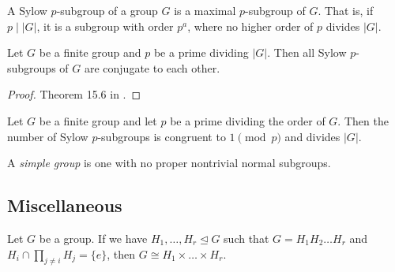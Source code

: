 \begin{df}
A Sylow $p$-subgroup of a group $G$ is a maximal $p$-subgroup of $G$.
That is, if $p \mid |G|$, it is a subgroup with order $p^a$, where no higher 
order of $p$ divides $|G|$.
\end{df}

\begin{theorem}[Sylow II]
    Let $G$ be a finite group and $p$ be a prime dividing $|G|$. 
    Then all Sylow $p$-subgroups of $G$ are conjugate to each other. 
\end{theorem}
\begin{proof}
    Theorem 15.6 in \cite{judson}.
\end{proof}

\begin{theorem}
    Let $G$ be a finite group and let $p$ be a prime dividing the order of $G$. 
    Then the number of Sylow $p$-subgroups is congruent to $1 \pmod{p}$ and 
    divides $|G|$.
\end{theorem}

\begin{df}
    A \emph{simple group} is one with no proper nontrivial normal subgroups.
\end{df}

\subsection{Miscellaneous}

\begin{theorem}
Let $G$ be a group. If we have $H_1, \dots, H_r \trianglelefteq G$ such that 
$G = H_1 H_2 \dots H_r$ and $H_i \cap \prod_{j \neq i} H_j = \{e\}$, then 
$G \cong H_1 \times \dots \times H_r$.
\end{theorem}
